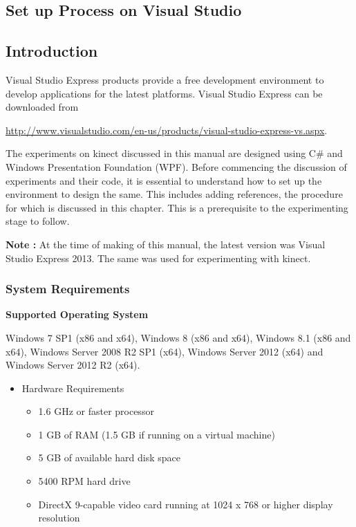 

\begin{flushleft}

\chapter{Set up Process on Visual Studio}

\section{\textbf{Introduction}}
\medskip

Visual Studio Express products provide a free development environment to develop applications for the latest platforms. Visual Studio Express can be downloaded from

\medskip

\url{http://www.visualstudio.com/en-us/products/visual-studio-express-vs.aspx}.

\medskip
The experiments on kinect discussed in this manual are designed using C\# and Windows Presentation Foundation (WPF). Before commencing the discussion of experiments and their code, it is essential to understand how to set up the environment to design the same. This includes adding references, the procedure for which is discussed in this chapter.
This is a prerequisite to the experimenting stage to follow.

\medskip
\textbf{Note : }
At the time of making of this manual, the latest version was Visual Studio Express 2013. The same was used for experimenting with kinect.

\medskip
\subsection{\textbf{ System Requirements}}
\medskip
\textbf{Supported Operating System}

Windows 7 SP1 (x86 and x64), Windows 8 (x86 and x64), Windows 8.1 (x86 and x64), Windows Server 2008 R2 SP1 (x64), Windows Server 2012 (x64) and Windows Server 2012 R2 (x64).

\medskip
\begin{itemize}
\item Hardware Requirements
\medskip
\begin{itemize}
\item 1.6 GHz or faster processor
\item 1 GB of RAM (1.5 GB if running on a virtual machine)
\item 5 GB of available hard disk space
\item 5400 RPM hard drive
\item DirectX 9-capable video card running at 1024 x 768 or higher display resolution
\end{itemize}
\medskip


\end{itemize}
\end{flushleft}
